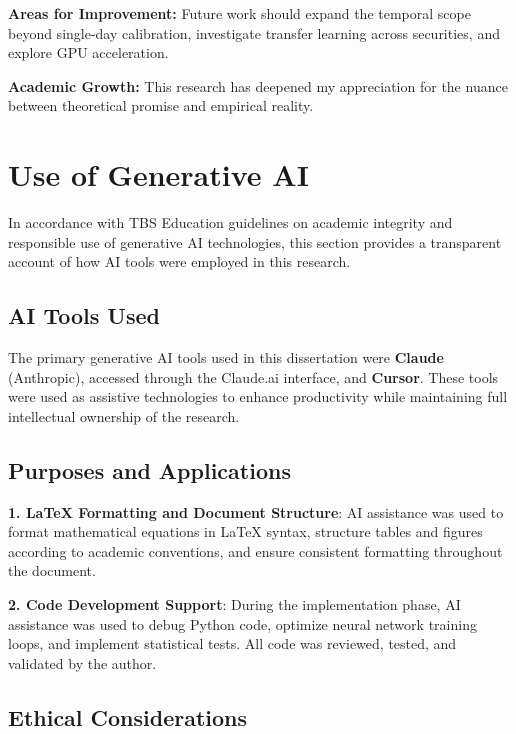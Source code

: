 \documentclass[12pt,a4paper]{article}
\begin{document}
\textbf{Areas for Improvement:} Future work should expand the temporal scope beyond single-day calibration, investigate transfer learning across securities, and explore GPU acceleration.

\textbf{Academic Growth:} This research has deepened my appreciation for the nuance between theoretical promise and empirical reality.

\newpage



\section*{Use of Generative AI}

In accordance with TBS Education guidelines on academic integrity and responsible use of generative AI technologies, this section provides a transparent account of how AI tools were employed in this research.

\subsection*{AI Tools Used}

The primary generative AI tools used in this dissertation were \textbf{Claude} (Anthropic), accessed through the Claude.ai interface, and \textbf{Cursor}. These tools were used as assistive technologies to enhance productivity while maintaining full intellectual ownership of the research.

\subsection*{Purposes and Applications}

\textbf{1. LaTeX Formatting and Document Structure}: AI assistance was used to format mathematical equations in LaTeX syntax, structure tables and figures according to academic conventions, and ensure consistent formatting throughout the document.

\textbf{2. Code Development Support}: During the implementation phase, AI assistance was used to debug Python code, optimize neural network training loops, and implement statistical tests. All code was reviewed, tested, and validated by the author.

\subsection*{Ethical Considerations}
\end{document}
